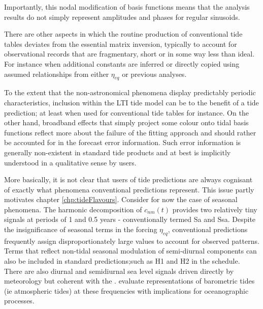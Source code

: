 Importantly, this nodal modification of basis functions means that the analysis results do not simply represent amplitudes and phases for regular sinusoids.  


There are other aspects in which the routine production of conventional tide tables deviates from the essential matrix inversion, typically to account for observational records that are fragmentary, short or in some way less than ideal.
For instance when additional constants are inferred or directly copied using assumed relationships from either $\eta_{eq}$ or previous analyses.  


To the extent that the non-astronomical phenomena display predictably periodic characteristics, inclusion within the LTI tide model can be to the benefit of a tide prediction; at least when used for conventional tide tables for instance.   
On the other hand, broadband effects that simply project some colour onto tidal basis functions reflect more about the failure of the fitting approach and should rather be accounted for in the forecast error information. Such error information is generally non-existent in standard tide products and at best is implicitly understood in a qualitative sense by users. 

More basically, it is not clear that users of tide predictions are always cognisant of exactly what phenomena conventional predictions represent.    This issue partly motivates chapter \ref{chp:tideFlavours}.
Consider for now the case of seasonal phenomena.   The harmonic decomposition of $c_{nm}(t)$ provides two relatively tiny signals at periods of 1 and 0.5 years - conventionally termed Sa and Ssa.  Despite the insignificance of seasonal terms in the forcing $\eta_{eq}$, conventional predictions frequently assign  disproportionately large values to account for observed patterns.  
Terms that reflect non-tidal seasonal modulation of semi-diurnal components can also be included in standard predictions;such as H1 and H2 in the \citet{Foreman:1977ua} schedule.  There are also  diurnal and semidiurnal sea level signals driven directly by meteorology but coherent with the \ATGP{}. \citet{Ray:2003ui} evaluate \NWP{} representations of barometric tides (ie atmospheric tides) at these frequencies with implications for oceanographic processes.  


